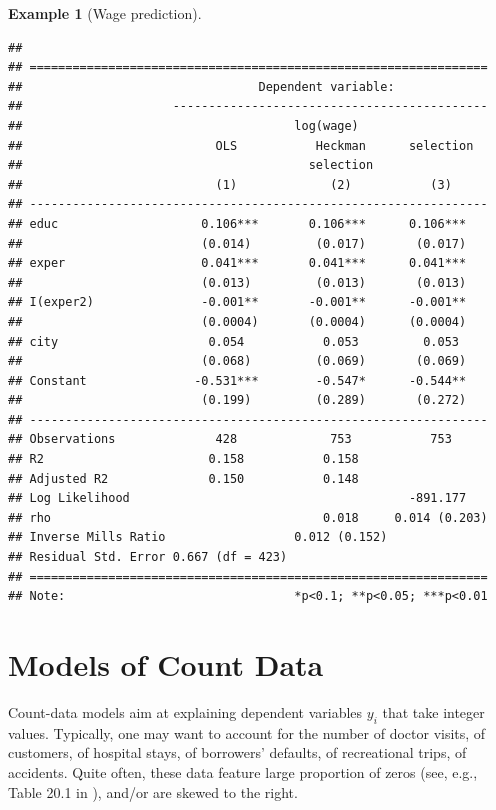\documentclass[
  12pt,
]{book}
\theoremstyle{definition}
\theoremstyle{definition}
\newtheorem{example}{Example}[chapter]
\theoremstyle{definition}
\theoremstyle{definition}
\theoremstyle{remark}
\begin{document}
\begin{example}[Wage prediction]
\begin{verbatim}
## 
## ================================================================
##                                 Dependent variable:             
##                     --------------------------------------------
##                                      log(wage)                  
##                           OLS           Heckman      selection  
##                                        selection                
##                           (1)             (2)           (3)     
## ----------------------------------------------------------------
## educ                    0.106***       0.106***      0.106***   
##                         (0.014)         (0.017)       (0.017)   
## exper                   0.041***       0.041***      0.041***   
##                         (0.013)         (0.013)       (0.013)   
## I(exper2)               -0.001**       -0.001**      -0.001**   
##                         (0.0004)       (0.0004)      (0.0004)   
## city                     0.054           0.053         0.053    
##                         (0.068)         (0.069)       (0.069)   
## Constant               -0.531***        -0.547*      -0.544**   
##                         (0.199)         (0.289)       (0.272)   
## ----------------------------------------------------------------
## Observations              428             753           753     
## R2                       0.158           0.158                  
## Adjusted R2              0.150           0.148                  
## Log Likelihood                                       -891.177   
## rho                                      0.018     0.014 (0.203)
## Inverse Mills Ratio                  0.012 (0.152)              
## Residual Std. Error 0.667 (df = 423)                            
## ================================================================
## Note:                                *p<0.1; **p<0.05; ***p<0.01
\end{verbatim}

\end{example}

\hypertarget{models-of-count-data}{%
\chapter{Models of Count Data}\label{models-of-count-data}}

Count-data models aim at explaining dependent variables \(y_i\) that take integer values. Typically, one may want to account for the number of doctor visits, of customers, of hospital stays, of borrowers' defaults, of recreational trips, of accidents. Quite often, these data feature large proportion of zeros (see, e.g., Table 20.1 in \citet{Cameron_Trivedi_2005}), and/or are skewed to the right.
\end{document}
